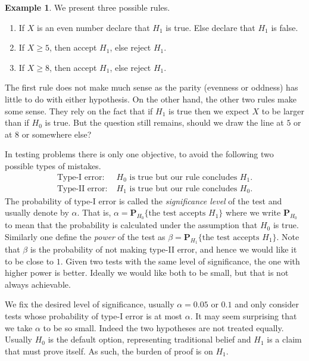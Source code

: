 \documentclass[preprint,  11pt]{amsart}
\theoremstyle{plain} %
\theoremstyle{definition} %
\newtheorem{example}[theorem]{Example}
\begin{document}
\begin{example} We present three possible rules.
\begin{enumerate}\setlength\itemsep{6pt}
\item If $X$ is an even number declare that $H_{1}$ is true. Else declare that $H_{1}$ is false.
\item If $X\ge 5$, then accept $H_{1}$, else reject $H_{1}$.
\item If $X\ge 8$, then accept $H_{1}$, else reject $H_{1}$.
\end{enumerate}
The first rule does not make much sense as the parity (evenness or oddness) has little to do with either hypothesis. On the other hand, the other two rules make some sense. They rely on the fact that if $H_{1}$ is true then we expect $X$ to be larger than if $H_{0}$ is true. But the question still remains, should we draw the line at $5$ or at $8$ or somewhere else?
\end{example}
In testing problems  there is only one objective, to avoid the following two possible types of mistakes.
\begin{align*}
\mbox{Type-I error:} & \; H_{0} \mbox{ is true but our rule concludes }H_{1}. \\
\mbox{Type-II error:} & \; H_{1} \mbox{ is true but our rule concludes }H_{0}.
\end{align*}
The probability of type-I error is called the {\em significance level} of the test and usually denote by $\alpha$. That is, $\alpha=\mathbf{P}_{H_{0}}\{\mbox{the test accepts }H_{1}\}$ where we write $\mathbf{P}_{H_{0}}$ to mean that the probability is calculated under the assumption that $H_{0}$ is true. Similarly one define the {\em power} of the test as $\beta=\mathbf{P}_{H_{1}}\{\mbox{the test accepts }H_{1}\}$. Note that $\beta$ is the probability of not making type-II error, and hence we would like it to be close to $1$. Given two tests with the same level of significance, the one with higher power is better. Ideally we would like both to be small, but that is not always achievable.

We fix the desired level of significance, usually $\alpha=0.05$ or $0.1$ and only consider tests whose probability of type-I error is at most $\alpha$. It may seem surprising that we take $\alpha$ to be so small. Indeed the  two hypotheses are not treated equally. Usually $H_{0}$ is the default option, representing traditional belief and $H_{1}$ is a claim that must prove itself. As such, the burden of proof is on $H_{1}$. 
\end{document}
